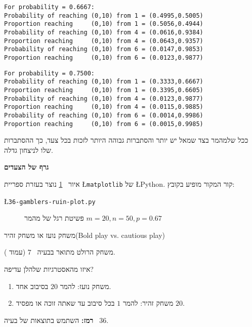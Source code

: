 \sml{}
\begin{verbatim}
For probability = 0.6667:
Probability of reaching (0,10) from 1 = (0.4995,0.5005)
Proportion reaching     (0,10) from 1 = (0.5056,0.4944)
Probability of reaching (0,10) from 4 = (0.0616,0.9384)
Proportion reaching     (0,10) from 4 = (0.0643,0.9357)
Probability of reaching (0,10) from 6 = (0.0147,0.9853)
Proportion reaching     (0,10) from 6 = (0.0123,0.9877)
\end{verbatim}

\begin{verbatim}
For probability = 0.7500:
Probability of reaching (0,10) from 1 = (0.3333,0.6667)
Proportion reaching     (0,10) from 1 = (0.3395,0.6605)
Probability of reaching (0,10) from 4 = (0.0123,0.9877)
Proportion reaching     (0,10) from 4 = (0.0115,0.9885)
Probability of reaching (0,10) from 6 = (0.0014,0.9986)
Proportion reaching     (0,10) from 6 = (0.0015,0.9985)
\end{verbatim}
ככל שלמהמר בצד שמאל יש יותר והסתברות גבוהה היותר לזכות בכל צעד, כך ההסתברות שלו לניצחון גדלה.

\textbf{גרף של הצעדים}

איור%
~\ref{f.plot}
נוצר בעזרת ספריית 
\L{\texttt{matplotlib}}
של
\L{Python}.
קור המקור מופיע בקובץ:
\begin{center}
\L{\texttt{36-gamblers-ruin-plot.py}}
\end{center}

\begin{figure}
\begin{center}

\end{center}
\caption{פשיטת רגל של מהמר $m = 20, n = 50, p = 0.67$}\label{f.plot}
\end{figure}


\begin{prob}{משחק נועז או משחק זהיר}{}{(Bold play vs. cautious play)}

משחק הרולט מתואר בבעיה%
~$7$
(עמוד%
\pageref{p.roulette}).

איזו מהאסטרגיות שלהלן עדיפה?
\begin{enumerate}
\item 
משחק נועז: להמר $20$ בסיבוב אחד.
\item
משחק זהיר: להמר $1$ בכל סיבוב עד שאתה זוכה או מפסיד $20$.
\end{enumerate}
\textbf{רמז:} 
השתמש בתוצאות של בעיה%
~$36$.
\end{prob}

